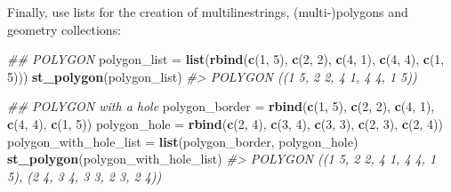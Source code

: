 \documentclass[]{krantz}
\newenvironment{Shaded}{\begin{snugshade}}{\end{snugshade}}
\newcommand{\CommentTok}[1]{\textcolor[rgb]{0.37,0.37,0.37}{\textit{#1}}}
\newcommand{\DecValTok}[1]{\textcolor[rgb]{0.06,0.06,0.06}{#1}}
\newcommand{\KeywordTok}[1]{\textcolor[rgb]{0.27,0.27,0.27}{\textbf{#1}}}
\newcommand{\NormalTok}[1]{#1}
\newcommand{\StringTok}[1]{\textcolor[rgb]{0.5,0.5,0.5}{#1}}
\begin{document}
Finally, use lists for the creation of multilinestrings, (multi-)polygons and geometry collections:

\begin{Shaded}
\begin{Highlighting}[]
\CommentTok{## POLYGON}
\NormalTok{polygon_list =}\StringTok{ }\KeywordTok{list}\NormalTok{(}\KeywordTok{rbind}\NormalTok{(}\KeywordTok{c}\NormalTok{(}\DecValTok{1}\NormalTok{, }\DecValTok{5}\NormalTok{), }\KeywordTok{c}\NormalTok{(}\DecValTok{2}\NormalTok{, }\DecValTok{2}\NormalTok{), }\KeywordTok{c}\NormalTok{(}\DecValTok{4}\NormalTok{, }\DecValTok{1}\NormalTok{), }\KeywordTok{c}\NormalTok{(}\DecValTok{4}\NormalTok{, }\DecValTok{4}\NormalTok{), }\KeywordTok{c}\NormalTok{(}\DecValTok{1}\NormalTok{, }\DecValTok{5}\NormalTok{)))}
\KeywordTok{st_polygon}\NormalTok{(polygon_list)}
\CommentTok{#> POLYGON ((1 5, 2 2, 4 1, 4 4, 1 5))}
\end{Highlighting}
\end{Shaded}

\begin{Shaded}
\begin{Highlighting}[]
\CommentTok{## POLYGON with a hole}
\NormalTok{polygon_border =}\StringTok{ }\KeywordTok{rbind}\NormalTok{(}\KeywordTok{c}\NormalTok{(}\DecValTok{1}\NormalTok{, }\DecValTok{5}\NormalTok{), }\KeywordTok{c}\NormalTok{(}\DecValTok{2}\NormalTok{, }\DecValTok{2}\NormalTok{), }\KeywordTok{c}\NormalTok{(}\DecValTok{4}\NormalTok{, }\DecValTok{1}\NormalTok{), }\KeywordTok{c}\NormalTok{(}\DecValTok{4}\NormalTok{, }\DecValTok{4}\NormalTok{), }\KeywordTok{c}\NormalTok{(}\DecValTok{1}\NormalTok{, }\DecValTok{5}\NormalTok{))}
\NormalTok{polygon_hole =}\StringTok{ }\KeywordTok{rbind}\NormalTok{(}\KeywordTok{c}\NormalTok{(}\DecValTok{2}\NormalTok{, }\DecValTok{4}\NormalTok{), }\KeywordTok{c}\NormalTok{(}\DecValTok{3}\NormalTok{, }\DecValTok{4}\NormalTok{), }\KeywordTok{c}\NormalTok{(}\DecValTok{3}\NormalTok{, }\DecValTok{3}\NormalTok{), }\KeywordTok{c}\NormalTok{(}\DecValTok{2}\NormalTok{, }\DecValTok{3}\NormalTok{), }\KeywordTok{c}\NormalTok{(}\DecValTok{2}\NormalTok{, }\DecValTok{4}\NormalTok{))}
\NormalTok{polygon_with_hole_list =}\StringTok{ }\KeywordTok{list}\NormalTok{(polygon_border, polygon_hole)}
\KeywordTok{st_polygon}\NormalTok{(polygon_with_hole_list)}
\CommentTok{#> POLYGON ((1 5, 2 2, 4 1, 4 4, 1 5), (2 4, 3 4, 3 3, 2 3, 2 4))}
\end{Highlighting}
\end{Shaded}
\end{document}
